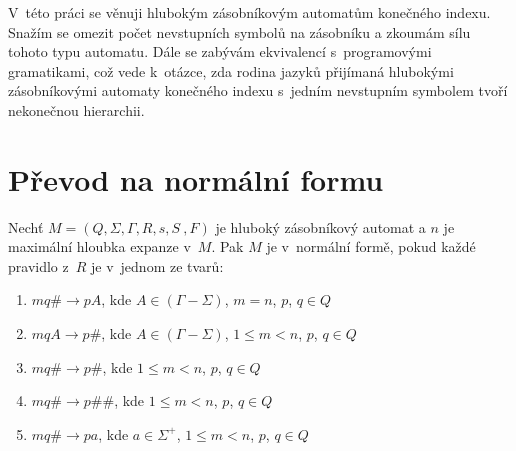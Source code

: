 
V~této práci se věnuji hlubokým zásobníkovým automatům konečného indexu. Snažím se omezit počet nevstupních symbolů na zásobníku a zkoumám sílu tohoto typu automatu.
Dále se zabývám ekvivalencí s~programovými gramatikami, což vede k~otázce, zda rodina jazyků přijímaná hlubokými zásobníkovými automaty konečného indexu s~jedním nevstupním 
symbolem tvoří nekonečnou hierarchii. 





\section{Převod na normální formu}


\begin{Def}
Nechť $M = (Q,\Sigma,\Gamma, R, s, S~, F)$ je hluboký zásobníkový automat
a $n$ je maximální hloubka expanze v~$M$.
Pak $M$ je v~normální formě, pokud každé pravidlo z~$R$ je v~jednom ze tvarů:

\begin{enumerate}
\renewcommand{\labelenumi}{(\roman{enumi})}
\item $mq\# \rightarrow pA$, kde $A \in (\Gamma - \Sigma)$, $m = n$, $p$, $q \in Q$
\item $mqA \rightarrow p\#$, kde $A \in (\Gamma - \Sigma)$, $1 \le m < n$, $p$, $q \in Q$
\item $mq\# \rightarrow p\#$, kde $1 \le m < n$, $p$, $q \in Q$
\item $mq\# \rightarrow p\#\#$, kde $1 \le m < n$, $p$, $q \in Q$
\item $mq\# \rightarrow pa$, kde $a \in {\Sigma}^+$, $1 \le m < n$, $p$, $q \in Q$

\end{enumerate}

\end{Def}


